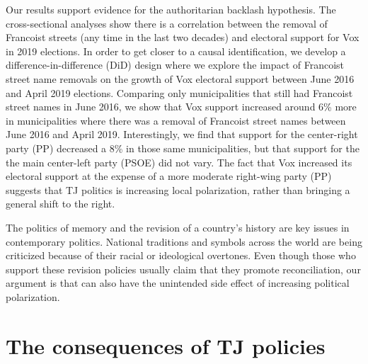 \documentclass[12pt, notitlepage]{article}
\begin{document}
Our results support evidence for the authoritarian backlash hypothesis.
The cross-sectional analyses show there is a correlation between the removal of Francoist streets (any time in the last two decades) and electoral support for Vox in 2019 elections.
In order to get closer to a causal identification, we develop a difference-in-difference (DiD) design where we explore the impact of Francoist street name removals on the growth of Vox electoral support between June 2016 and April 2019 elections.
Comparing only municipalities that still had Francoist street names in June 2016, we show that Vox support increased around 6\% more in municipalities where there was a removal of Francoist street names between June 2016 and April 2019. Interestingly, we find that support for the center-right party (PP) decreased a 8\% in those same municipalities, but that support for the the main center-left party (PSOE) did not vary.
The fact that Vox increased its electoral support at the expense of a more moderate right-wing party (PP) suggests that TJ politics is increasing local polarization, rather than bringing a general shift to the right.

The politics of memory and the revision of a country's history are key issues in contemporary politics.
National traditions and symbols across the world are being criticized because of their racial or ideological overtones.
Even though those who support these revision policies usually claim that they promote reconciliation, our argument is that can also have the unintended side effect of increasing political polarization.


\section*{The consequences of TJ policies}
\end{document}

